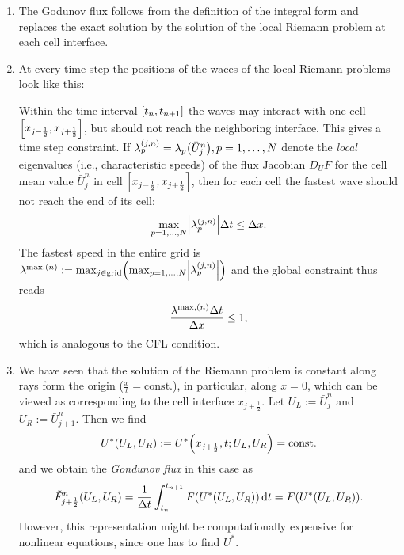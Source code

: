 \begin{remark}
	\begin{enumerate}
		\item The Godunov flux follows from the definition of the integral form and replaces the exact solution by the solution of the local Riemann problem at each cell interface.
		\item At every time step the positions of the waces of the local Riemann problems look like this:
		\begin{center}
		\end{center}
		Within the time interval \(\brackets*{t_n, t_{n + 1}}\) the waves may interact with one cell \(\brackets*{x_{j - \frac{1}{2}}, x_{j + \frac{1}{2}}}\), but should not reach the neighboring interface.
		This gives a time step constraint.
		If \(\lambda_p^{\parentheses*{j, n}} = \lambda_p\parentheses*{\bar{U}_j^n}, p = 1, \ldots, N\) denote the \emph{local} eigenvalues (i.e., characteristic speeds) of the flux Jacobian \(D_U F\) for the cell mean value \(\bar{U}_j^n\) in cell \(\brackets*{x_{j - \frac{1}{2}}, x_{j + \frac{1}{2}}}\), then for each cell the fastest wave should not reach the end of its cell:
		\[
			\max_{p = 1, \ldots, N}\absolute*{\lambda_p^{\parentheses*{j, n}}}\Delta t \le \Delta x.
		\]
		The fastest speed in the entire grid is \(\lambda^{\text{max}, \parentheses*{n}} := \max_{j \in \text{grid}}\parentheses*{\max_{p = 1, \ldots, N}\absolute*{\lambda_p^{\parentheses*{j, n}}}}\) and the global constraint thus reads
		\[
			\frac{\lambda^{\text{max}, \parentheses*{n}}\Delta t}{\Delta x} \le 1,
		\]
		which is analogous to the CFL condition.
		\item We have seen that the solution of the Riemann problem is constant along rays form the origin (\(\frac{x}{t} = \text{const.}\)), in particular, along \(x = 0\), which can be viewed as corresponding to the cell interface \(x_{j + \frac{1}{2}}\).
		Let \(U_L := \bar{U}_j^n\) and \(U_R := \bar{U}_{j + 1}^n\).
		Then we find
		\[
			U^*\parentheses*{U_L, U_R} := U^*\parentheses*{x_{j + \frac{1}{2}}, t; U_L, U_R} = \text{const.}
		\]
		and we obtain the \emph{Gondunov flux} in this case as
		\[
			\tilde{F}_{j + \frac{1}{2}}^n\parentheses*{U_L, U_R} = \frac{1}{\Delta t}\int_{t_n}^{t_{n + 1}}F\parentheses*{U^*\parentheses*{U_L, U_R}}\d t = F\parentheses*{U^*\parentheses*{U_L, U_R}}.
		\]
		However, this representation might be computationally expensive for nonlinear equations, since one has to find \(U^*\).
	\end{enumerate}
\end{remark}

